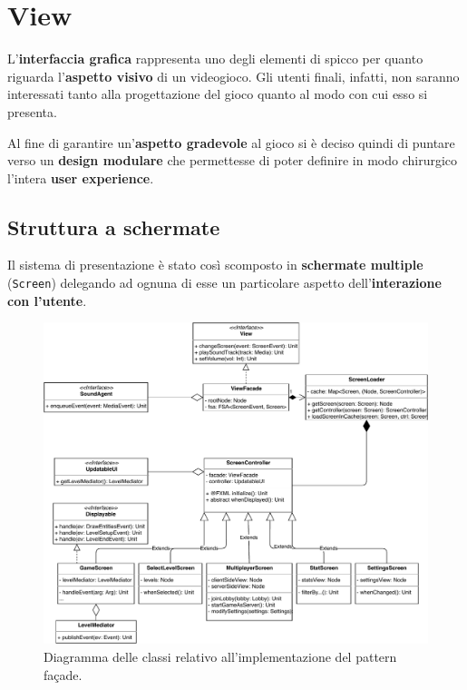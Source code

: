 \section{View}
\label{sec:view_design}

L'\textbf{interfaccia grafica} rappresenta uno degli elementi di spicco per quanto riguarda l'\textbf{aspetto visivo} di un videogioco. Gli utenti finali, infatti, non saranno interessati tanto alla progettazione del gioco quanto al modo con cui esso si presenta.

Al fine di garantire un'\textbf{aspetto gradevole} al gioco si è deciso quindi di puntare verso un \textbf{design modulare} che permettesse di poter definire in modo chirurgico l'intera \textbf{user experience}.

\subsection{Struttura a schermate}
Il sistema di presentazione è stato così scomposto in \textbf{schermate multiple} (\texttt{Screen}) delegando ad ognuna di esse un particolare aspetto dell'\textbf{interazione con l'utente}.

\begin{figure}[H]
	\centering
	\includegraphics[width=0.99\columnwidth]{drawio/viewFacade/viewFacade.pdf}
	\caption{Diagramma delle classi relativo all'implementazione del pattern façade.}
	\label{fig:viewFacade}
\end{figure}

